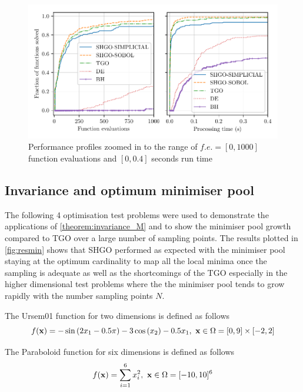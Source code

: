 \begin{figure} %
\centerline{\includegraphics[scale=0.83]{./Fig13.pdf}}
{\caption{Performance profiles zoomed in to the range of $f.e.=[0, 1000]$ function evaluations and $[0, 0.4]$ seconds run time} \label{fig:pprofilezoom}} 
\end{figure}

\subsection{Invariance and optimum minimiser pool}
The following 4 optimisation test problems were used to demonstrate the applications of \autoref{theorem:invariance_M} and to show the minimiser pool growth compared to TGO over a large number of sampling points. The results plotted in \autoref{fig:resmin} shows that SHGO performed as expected with the minimiser pool staying at the optimum cardinality to map all the local minima once the sampling is adequate as well as the shortcomings of the TGO especially in the higher dimensional test problems where the the minimiser pool tends to grow rapidly with the number sampling points $N$.

The Ursem01 function for two dimensions is defined as follows \cite{Gavana2016}
\begin{equation} \label{eq:Ursem01}
f(\bold{x}) =  \displaystyle - \sin{\left(2 x_1  - 0.5 \pi \right) - 3 \cos{\left(x_2\right)}} - 0.5 x_1 , ~ \bold{x} \in \Omega =  [0, 9] \times [-2, 2] 
\end{equation}

The Paraboloid function for six dimensions is defined as follows %
\begin{equation} \label{eq:Paraboloid }
f(\bold{x}) =  \displaystyle \sum^6_{i=1} x_i^2, ~ \bold{x} \in \Omega =  [-10, 10]^6 
\end{equation}

